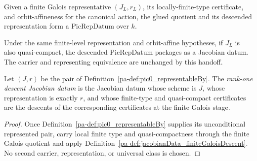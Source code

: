 \begin{definition}
  \label{pa-def:picRepDatum_finiteGaloisDescent}
  \leanok

  Given a finite Galois representative \((J_L,r_L)\), its locally-finite-type certificate,
  and orbit-affineness for the canonical action, the glued quotient and its descended
  representation form a \(\mathrm{PicRepDatum}\) over \(k\).
\end{definition}

\begin{definition}
  \label{pa-def:jacobianData_finiteGaloisDescent}
  \leanok

  Under the same finite-level representation and orbit-affine hypotheses, if \(J_L\) is also
  quasi-compact, the descended \(\mathrm{PicRepDatum}\) packages as a Jacobian datum.  The
  carrier and representing equivalence are unchanged by this handoff.
\end{definition}

\begin{definition}
  \label{pa-def:jacobianData}
  \notready
  Let \((J,r)\) be the pair of
  Definition~\ref{pa-def:pic0_representableBy}.  The \emph{rank-one descent Jacobian datum} is
  the Jacobian datum whose scheme is \(J\), whose representation is exactly \(r\), and whose
  finite-type and quasi-compact certificates are the descents of the corresponding
  certificates at the finite Galois stage.
\end{definition}
\begin{proof}
  Once Definition~\ref{pa-def:pic0_representableBy} supplies its unconditional represented pair,
  carry local finite type and quasi-compactness through the finite Galois quotient and apply
  Definition~\ref{pa-def:jacobianData_finiteGaloisDescent}.  No second carrier, representation,
  or universal class is chosen.
\end{proof}
